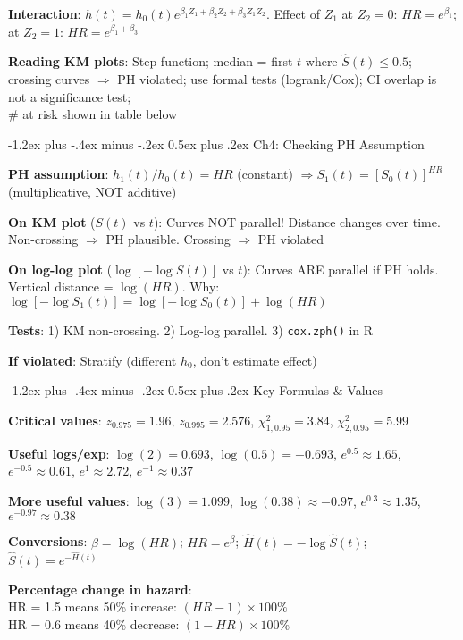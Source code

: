 ﻿\documentclass[10pt,letterpaper]{extarticle}
\makeatletter
\renewcommand{\section}{\@startsection{section}{1}{0mm}%
                                {-1.2ex plus -.4ex minus -.2ex}%
                                {0.5ex plus .2ex}%
                                {\normalfont\normalsize\bfseries}}
\newcommand{\h}[1]{\textbf{#1}}
\makeatother
\begin{document}
\begin{multicols}{3}
\h{Interaction}: $h(t)=h_0(t)e^{\beta_1 Z_1+\beta_2 Z_2+\beta_3 Z_1 Z_2}$. Effect of $Z_1$ at $Z_2=0$: $HR=e^{\beta_1}$; at $Z_2=1$: $HR=e^{\beta_1+\beta_3}$

\h{Reading KM plots}: Step function; median = first $t$ where $\hat{S}(t) \le 0.5$; crossing curves $\Rightarrow$ PH violated; use formal tests (logrank/Cox); CI overlap is not a significance test; \\\# at risk shown in table below

\vspace{2pt}
\section{Ch4: Checking PH Assumption}

\h{PH assumption}: $h_1(t)/h_0(t) = HR$ (constant) $\Rightarrow S_1(t) = [S_0(t)]^{HR}$ (multiplicative, NOT additive)

\h{On KM plot} ($S(t)$ vs $t$): Curves NOT parallel! Distance changes over time. Non-crossing $\Rightarrow$ PH plausible. Crossing $\Rightarrow$ PH violated

\h{On log-log plot} ($\log[-\log S(t)]$ vs $t$): Curves ARE parallel if PH holds. Vertical distance = $\log(HR)$. Why: $\log[-\log S_1(t)] = \log[-\log S_0(t)] + \log(HR)$

\h{Tests}: 1) KM non-crossing. 2) Log-log parallel. 3) \texttt{cox.zph()} in R

\h{If violated}: Stratify (different $h_0$, don't estimate effect)

\vspace{2pt}
\section{Key Formulas \& Values}

\h{Critical values}: $z_{0.975}=1.96$, $z_{0.995}=2.576$, $\chi^2_{1,0.95}=3.84$, $\chi^2_{2,0.95}=5.99$

\h{Useful logs/exp}: $\log(2)=0.693$, $\log(0.5)=-0.693$, $e^{0.5}\approx 1.65$, $e^{-0.5}\approx 0.61$, $e^1\approx 2.72$, $e^{-1}\approx 0.37$

\h{More useful values}: $\log(3)=1.099$, $\log(0.38)\approx -0.97$, $e^{0.3}\approx 1.35$, $e^{-0.97}\approx 0.38$

\h{Conversions}: $\beta=\log(HR)$; $HR=e^\beta$; $\hat{H}(t)=-\log\hat{S}(t)$; $\hat{S}(t)=e^{-\hat{H}(t)}$

\h{Percentage change in hazard}: \\
HR = 1.5 means 50\% increase: $(HR-1) \times 100\%$ \\
HR = 0.6 means 40\% decrease: $(1-HR) \times 100\%$


\end{multicols}
\end{document}
